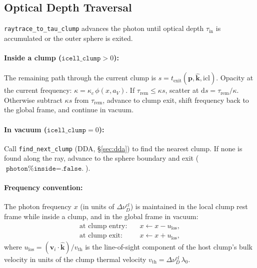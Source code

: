 \documentclass[english,a4paper]{my_memo}
\begin{document}
\subsection{Optical Depth Traversal}
\label{sec:clump_traverse}

\texttt{raytrace\_to\_tau\_clump} advances the photon until optical depth
$\tau_\mathrm{in}$ is accumulated or the outer sphere is exited.

\paragraph{Inside a clump ($\texttt{icell\_clump} > 0$):}
The remaining path through the current clump is
$s = t_\mathrm{exit}(\mathbf{p}, \hat{\mathbf{k}}, \mathrm{icl})$.
Opacity at the current frequency:
$\kappa = \kappa_c\,\phi(x, a_V)$.
If $\tau_\mathrm{rem} \le \kappa s$, scatter at $\mathrm{d}s = \tau_\mathrm{rem}/\kappa$.
Otherwise subtract $\kappa s$ from $\tau_\mathrm{rem}$, advance to clump exit,
shift frequency back to the global frame, and continue in vacuum.

\paragraph{In vacuum ($\texttt{icell\_clump} = 0$):}
Call \texttt{find\_next\_clump} (DDA, \S\ref{sec:dda}) to find the nearest
clump.  If none is found along the ray, advance to the sphere boundary and
exit ($\texttt{photon\%inside} = \texttt{.false.}$).

\paragraph{Frequency convention:}
The photon frequency $x$ (in units of $\Delta\nu_D^{cl}$) is maintained in
the local clump rest frame while inside a clump, and in the global frame in
vacuum:
\begin{align}
  \text{at clump entry:}\quad &x \leftarrow x - u_\mathrm{los},\\
  \text{at clump exit:}\quad  &x \leftarrow x + u_\mathrm{los},
\end{align}
where $u_\mathrm{los} = (\boldsymbol{v}_i \cdot \hat{\mathbf{k}})/v_\mathrm{th}$
is the line-of-sight component of the host clump's bulk velocity in units
of the clump thermal velocity $v_\mathrm{th}=\Delta\nu_D^{cl}\,\lambda_0$.
\end{document}
